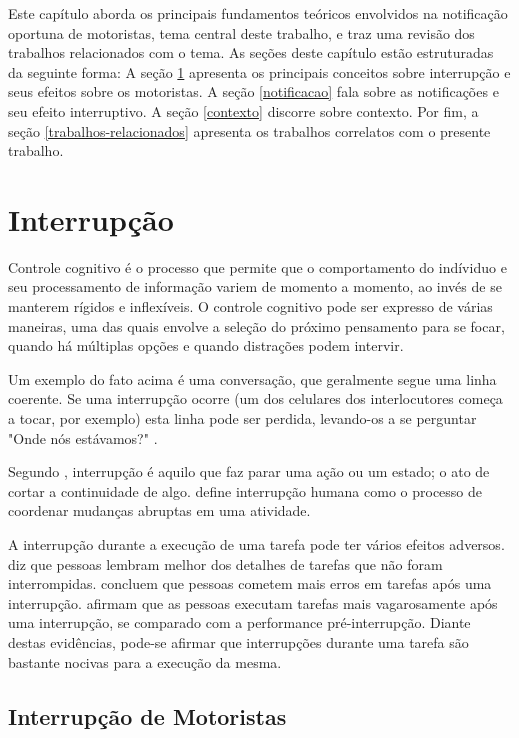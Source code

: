 \label{revisao-lit}
Este capítulo aborda os principais fundamentos teóricos envolvidos na notificação oportuna de motoristas,
tema central deste trabalho, e traz uma revisão dos trabalhos relacionados com o tema. As seções deste capítulo
estão estruturadas da seguinte forma: A seção \ref{interrupcao} apresenta os principais conceitos sobre interrupção
e seus efeitos sobre os motoristas. A seção \ref{notificacao} fala sobre as notificações e seu efeito interruptivo.
A seção \ref{contexto} discorre sobre contexto. Por fim, a seção \ref{trabalhos-relacionados} apresenta os trabalhos
correlatos com o presente trabalho.

\section{Interrupção}
\label{interrupcao}
Controle cognitivo é o processo que permite que o comportamento do indíviduo e seu processamento de informação variem de momento a
momento, ao invés de se manterem rígidos e inflexíveis. O controle cognitivo pode ser expresso de várias maneiras, uma das quais
envolve a seleção do próximo pensamento para se focar, quando há múltiplas opções e quando distrações podem intervir.

Um exemplo do fato acima é uma conversação, que geralmente segue uma linha coerente. Se uma interrupção ocorre (um dos celulares dos
interlocutores começa a tocar, por exemplo) esta linha pode ser perdida, levando-os a se perguntar "Onde nós estávamos?" \cite{altmann2014momentary}.

Segundo , interrupção é aquilo que faz parar uma ação ou um estado; o ato de cortar a continuidade de
algo.  define interrupção humana como o processo de coordenar mudanças abruptas em uma atividade.

A interrupção durante a execução de uma tarefa pode ter vários efeitos adversos.  diz
que pessoas lembram melhor dos detalhes de tarefas que não foram interrompidas.  concluem que
pessoas cometem mais erros em tarefas após uma interrupção.  afirmam que as pessoas executam tarefas
mais vagarosamente após uma interrupção, se comparado com a performance pré-interrupção. Diante destas evidências, pode-se
afirmar que interrupções durante uma tarefa são bastante nocivas para a execução da mesma.

\subsection{Interrupção de Motoristas}
\label{interrupcao-motoristas}

